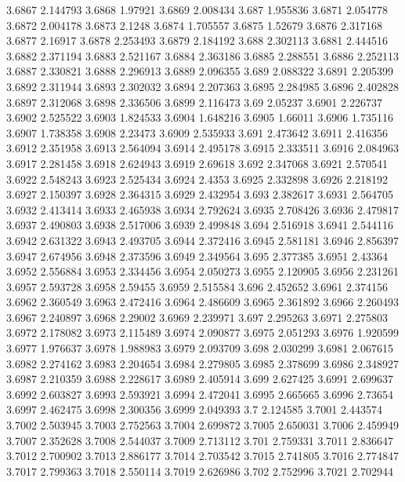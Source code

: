 3.6867  2.144793
3.6868  1.97921
3.6869  2.008434
3.687  1.955836
3.6871  2.054778
3.6872  2.004178
3.6873  2.1248
3.6874  1.705557
3.6875  1.52679
3.6876  2.317168
3.6877  2.16917
3.6878  2.253493
3.6879  2.184192
3.688  2.302113
3.6881  2.444516
3.6882  2.371194
3.6883  2.521167
3.6884  2.363186
3.6885  2.288551
3.6886  2.252113
3.6887  2.330821
3.6888  2.296913
3.6889  2.096355
3.689  2.088322
3.6891  2.205399
3.6892  2.311944
3.6893  2.302032
3.6894  2.207363
3.6895  2.284985
3.6896  2.402828
3.6897  2.312068
3.6898  2.336506
3.6899  2.116473
3.69  2.05237
3.6901  2.226737
3.6902  2.525522
3.6903  1.824533
3.6904  1.648216
3.6905  1.66011
3.6906  1.735116
3.6907  1.738358
3.6908  2.23473
3.6909  2.535933
3.691  2.473642
3.6911  2.416356
3.6912  2.351958
3.6913  2.564094
3.6914  2.495178
3.6915  2.333511
3.6916  2.084963
3.6917  2.281458
3.6918  2.624943
3.6919  2.69618
3.692  2.347068
3.6921  2.570541
3.6922  2.548243
3.6923  2.525434
3.6924  2.4353
3.6925  2.332898
3.6926  2.218192
3.6927  2.150397
3.6928  2.364315
3.6929  2.432954
3.693  2.382617
3.6931  2.564705
3.6932  2.413414
3.6933  2.465938
3.6934  2.792624
3.6935  2.708426
3.6936  2.479817
3.6937  2.490803
3.6938  2.517006
3.6939  2.499848
3.694  2.516918
3.6941  2.544116
3.6942  2.631322
3.6943  2.493705
3.6944  2.372416
3.6945  2.581181
3.6946  2.856397
3.6947  2.674956
3.6948  2.373596
3.6949  2.349564
3.695  2.377385
3.6951  2.43364
3.6952  2.556884
3.6953  2.334456
3.6954  2.050273
3.6955  2.120905
3.6956  2.231261
3.6957  2.593728
3.6958  2.59455
3.6959  2.515584
3.696  2.452652
3.6961  2.374156
3.6962  2.360549
3.6963  2.472416
3.6964  2.486609
3.6965  2.361892
3.6966  2.260493
3.6967  2.240897
3.6968  2.29002
3.6969  2.239971
3.697  2.295263
3.6971  2.275803
3.6972  2.178082
3.6973  2.115489
3.6974  2.090877
3.6975  2.051293
3.6976  1.920599
3.6977  1.976637
3.6978  1.988983
3.6979  2.093709
3.698  2.030299
3.6981  2.067615
3.6982  2.274162
3.6983  2.204654
3.6984  2.279805
3.6985  2.378699
3.6986  2.348927
3.6987  2.210359
3.6988  2.228617
3.6989  2.405914
3.699  2.627425
3.6991  2.699637
3.6992  2.603827
3.6993  2.593921
3.6994  2.472041
3.6995  2.665665
3.6996  2.73654
3.6997  2.462475
3.6998  2.300356
3.6999  2.049393
3.7  2.124585
3.7001  2.443574
3.7002  2.503945
3.7003  2.752563
3.7004  2.699872
3.7005  2.650031
3.7006  2.459949
3.7007  2.352628
3.7008  2.544037
3.7009  2.713112
3.701  2.759331
3.7011  2.836647
3.7012  2.700902
3.7013  2.886177
3.7014  2.703542
3.7015  2.741805
3.7016  2.774847
3.7017  2.799363
3.7018  2.550114
3.7019  2.626986
3.702  2.752996
3.7021  2.702944
